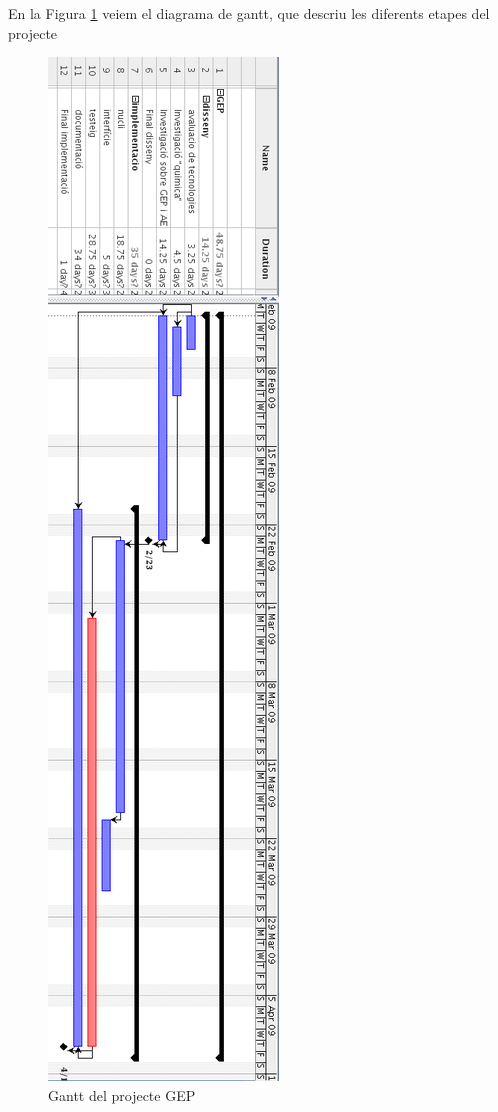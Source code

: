 En la Figura \ref{fig:gep-gantt} veiem el diagrama de gantt, que descriu les
diferents etapes del projecte 

\begin{figure}[h]
	\begin{center}
		\includegraphics[scale=0.4]{gep-gantt.png}
	\end{center}
	\caption{Gantt del projecte GEP}
	\label{fig:gep-gantt}
\end{figure}

